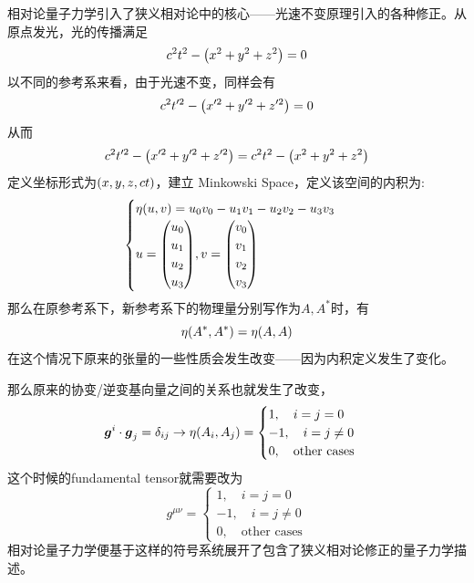 \documentclass[12pt,a4paper,openany,twoside]{book}
\numberwithin{equation}{section}
\begin{document}
        相对论量子力学引入了狭义相对论中的核心——光速不变原理引入的各种修正。从原点发光，光的传播满足
        \begin{equation}
          c^2 t^2 -\qty(x^2 + y^2 + z^2 ) =0
        \end{equation}
        以不同的参考系来看，由于光速不变，同样会有
        \begin{equation}
          c^2 t'^2 -\qty(x'^2 + y'^2 + z'^2)=0
        \end{equation}
        从而
        \begin{equation}
          c^2 t'^2 -\qty(x'^2 + y'^2 + z'^2) = c^2 t^2 -\qty(x^2 + y^2 + z^2 )
        \end{equation}
        定义坐标形式为$\qty(x,y,z,ct)$，建立 Minkowski Space，定义该空间的内积为:
        \begin{equation}
          \begin{cases}
            \eta\qty(u,v) = u_0 v_0 - u_1 v_1 - u_2 v_2 - u_3 v_3\\
            u=\mqty(
              u_0 \\
              u_1 \\
              u_2 \\
              u_3
            ),
            v=\mqty(
              v_0 \\
              v_1 \\
              v_2 \\
              v_3
            )
          \end{cases}
        \end{equation}
        那么在原参考系下，新参考系下的物理量分别写作为$A,A^*$时，有
        \begin{equation}
          \eta\qty(A^*,A^*)=\eta\qty(A,A)
        \end{equation}
        在这个情况下原来的张量的一些性质会发生改变——因为内积定义发生了变化。

        那么原来的协变/逆变基向量之间的关系也就发生了改变，
        \begin{equation}
          \vb*{g}^i \cdot \vb*{g}_j = \delta_{ij} \rightarrow \eta\qty(A_i,A_j) =
          \begin{cases}
            1,\quad i=j=0\\
            -1,\quad i=j\neq 0 \\
            0,\quad \text{other cases}
          \end{cases}
        \end{equation}
        这个时候的fundamental tensor就需要改为
        \begin{equation}
          g^{\mu\nu} =
          \begin{cases}
            1,\quad i=j=0\\
            -1,\quad i=j\neq 0 \\
            0,\quad \text{other cases}
          \end{cases}
        \end{equation}
        相对论量子力学便基于这样的符号系统展开了包含了狭义相对论修正的量子力学描述。
\end{document}
